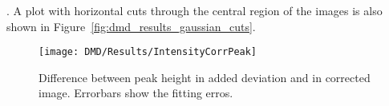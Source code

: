 . 
A plot with horizontal cuts through the central region of the images is also shown in Figure~\ref{fig:dmd_results_gaussian_cuts}.
\begin{figure}[htbp]
    \centering
    \texttt{[image: DMD/Results/IntensityCorrPeak]}
    \caption[Difference between peak height in added deviation and in corrected image]{Difference between peak height in added deviation and in corrected image. Errorbars show the fitting erros.}
    \label{fig:dmd_results_gaussian_peak}
\end{figure}
\fi %

